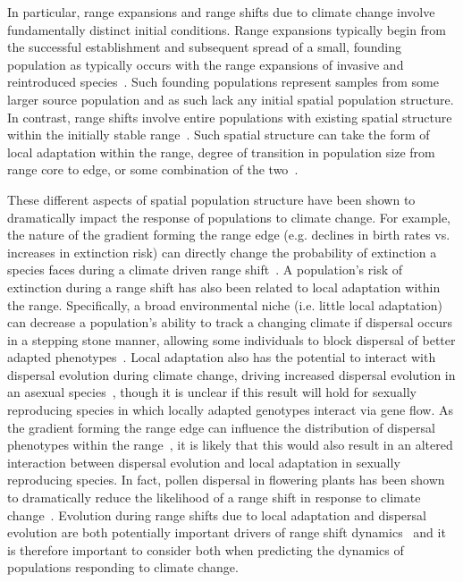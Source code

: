 \documentclass[11pt, oneside]{article}
\begin{document}
In particular, range expansions and range shifts due to climate change involve fundamentally distinct initial conditions. Range expansions typically begin from the successful establishment and subsequent spread of a small, founding population as typically occurs with the range expansions of invasive and reintroduced species~\citep{hastings2005spatial}. Such founding populations represent samples from some larger source population and as such lack any initial spatial population structure. In contrast, range shifts involve entire populations with existing spatial structure within the initially stable range~\citep{hargreaves2014evolution}. Such spatial structure can take the form of local adaptation within the range, degree of transition in population size from range core to edge, or some combination of the two~\citep{hargreaves2014evolution, hargreaves2015fitness, henry2013eco}. 

These different aspects of spatial population structure have been shown to dramatically impact the response of populations to climate change. For example, the nature of the gradient forming the range edge (e.g. declines in birth rates vs. increases in extinction risk) can directly change the probability of extinction a species faces during a climate driven range shift~\citep{henry2013eco}. A population's risk of extinction during a range shift has also been related to local adaptation within the range. Specifically, a broad environmental niche (i.e. little local adaptation) can decrease a population's ability to track a changing climate if dispersal occurs in a stepping stone manner, allowing some individuals to block dispersal of better adapted phenotypes~\citep{atkins2010local}. Local adaptation also has the potential to interact with dispersal evolution during climate change, driving increased dispersal evolution in an asexual species~\citep{hargreaves2015fitness}, though it is unclear if this result will hold for sexually reproducing species in which locally adapted genotypes interact via gene flow. As the gradient forming the range edge can influence the distribution of dispersal phenotypes within the range~\citep{henry2013eco}, it is likely that this would also result in an altered interaction between dispersal evolution and local adaptation in sexually reproducing species. In fact, pollen dispersal in flowering plants has been shown to dramatically reduce the likelihood of a range shift in response to climate change~\citep{aguilee2016pollen}. Evolution during range shifts due to local adaptation and dispersal evolution are both potentially important drivers of range shift dynamics~\citep{van2016spatial} and it is therefore important to consider both when predicting the dynamics of populations responding to climate change.
\end{document}
